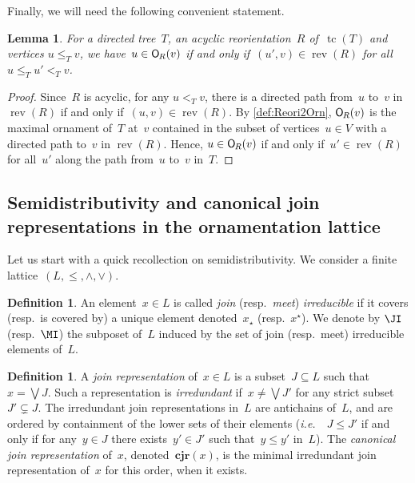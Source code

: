 \documentclass{amsart}
\newtheorem{lemma}[theorem]{Lemma}
\theoremstyle{definition}
\newtheorem{definition}[theorem]{Definition}
\DeclareMathOperator{\tc}{tc} %
\newcommand{\ie}{\textit{i.e.}~} %
\newcommand{\darkblue}{\color{darkblue}} %
\newcommand{\defn}[1]{\textsl{\darkblue #1}} %
\newcommand{\meet}{\wedge} %
\newcommand{\join}{\vee} %
\newcommand{\bigJoin}{\bigvee} %
\newcommand{\CJR}{\mathbf{cjr}} %
\newcommand{\mymap}[2]{\mathsf{#1}_{\hspace{-.7pt}#2}}
\newcommand{\orn}[1]{\mymap{O}{#1}}  %
\DeclareMathOperator{\rev}{rev} %
\begin{document}
Finally, we will need the following convenient statement.

\begin{lemma}
\label{lem:Reori2OrnT}
For a directed tree~$T$, an acyclic reorientation~$R$ of~$\tc(T)$ and vertices $u \le_T v$, we have~$u \in \orn{R}(v)$ if and only if~$(u',v) \in \rev(R)$ for all~$u \le_T u' <_T v$.
\end{lemma}

\begin{proof}
Since~$R$ is acyclic, for any $u <_T v$, there is a directed path from~$u$ to~$v$ in~$\rev(R)$ if and only if~$(u,v) \in \rev(R)$.
By \cref{def:Reori2Orn}, $\orn{R}(v)$ is the maximal ornament of~$T$ at~$v$ contained in the subset of vertices~$u \in V$ with a directed path to~$v$ in $\rev(R)$.
Hence, $u \in \orn{R}(v)$ if and only if~$u' \in \rev(R)$ for all~$u'$ along the path from~$u$ to~$v$ in~$T$.
\end{proof}


\subsection{Semidistributivity and canonical join representations in the ornamentation lattice}
\label{subsec:semidistributivityT}

Let us start with a quick recollection on semidistributivity.
We consider a finite lattice~$(L, \le, \meet, \join)$.

\begin{definition}
An element~$x \in L$ is called \defn{join} (resp.~\defn{meet}) \defn{irreducible} if it covers (resp.~is covered by) a unique element denoted~$x_\star$ (resp.~$x^\star$).
We denote by $\JI$ (resp.~$\MI$) the subposet of~$L$ induced by the set of join (resp.~meet) irreducible elements of~$L$.
\end{definition}

\begin{definition}
A \defn{join representation} of~$x \in L$ is a subset~${J \subseteq L}$ such that~$x = \bigJoin J$.
Such a representation is \defn{irredundant} if~$x \ne \bigJoin J'$ for any strict subset~$J' \subsetneq J$.
The irredundant join representations in~$L$ are antichains of~$L$, and are ordered by containment of the lower sets of their elements (\ie~$J \le J'$ if and only if for any~$y \in J$ there exists~$y' \in J'$ such that~$y \le y'$ in~$L$).
The \defn{canonical join representation} of~$x$, denoted~$\CJR(x)$, is the minimal irredundant join representation of~$x$ for this order, when it exists.
\end{definition}
\end{document}
